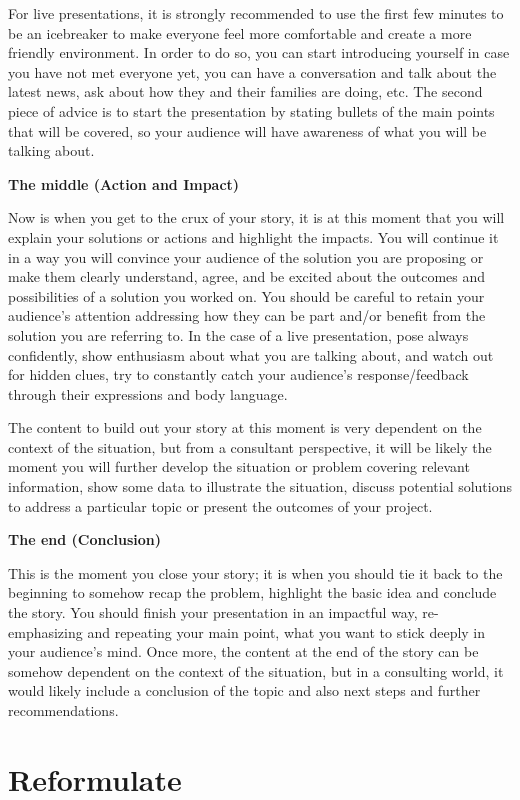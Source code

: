 \documentclass[
]{krantz}
\begin{document}
For live presentations, it is strongly recommended to use the first few minutes to be an icebreaker to make everyone feel more comfortable and create a more friendly environment. In order to do so, you can start introducing yourself in case you have not met everyone yet, you can have a conversation and talk about the latest news, ask about how they and their families are doing, etc. The second piece of advice is to start the presentation by stating bullets of the main points that will be covered, so your audience will have awareness of what you will be talking about.

\textbf{The middle (Action and Impact)}

Now is when you get to the crux of your story, it is at this moment that you will explain your solutions or actions and highlight the impacts. You will continue it in a way you will convince your audience of the solution you are proposing or make them clearly understand, agree, and be excited about the outcomes and possibilities of a solution you worked on. You should be careful to retain your audience's attention addressing how they can be part and/or benefit from the solution you are referring to. In the case of a live presentation, pose always confidently, show enthusiasm about what you are talking about, and watch out for hidden clues, try to constantly catch your audience's response/feedback through their expressions and body language.

The content to build out your story at this moment is very dependent on the context of the situation, but from a consultant perspective, it will be likely the moment you will further develop the situation or problem covering relevant information, show some data to illustrate the situation, discuss potential solutions to address a particular topic or present the outcomes of your project.

\textbf{The end (Conclusion)}

This is the moment you close your story; it is when you should tie it back to the beginning to somehow recap the problem, highlight the basic idea and conclude the story. You should finish your presentation in an impactful way, re-emphasizing and repeating your main point, what you want to stick deeply in your audience's mind. Once more, the content at the end of the story can be somehow dependent on the context of the situation, but in a consulting world, it would likely include a conclusion of the topic and also next steps and further recommendations.

\hypertarget{reformulate2}{%
\section{Reformulate}\label{reformulate2}}
\end{document}
